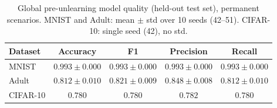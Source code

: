 \begin{table}[H]
\centering
\caption{Global pre-unlearning model quality (held-out test set), permanent scenarios. MNIST and Adult: mean $\pm$ std over 10 seeds (42--51). CIFAR-10: single seed (42), no std.}
\label{tab:baseline}
\small
\begin{tabular}{@{} l c c c c @{}}
\toprule
\textbf{Dataset} & \textbf{Accuracy} & \textbf{F1} & \textbf{Precision} & \textbf{Recall} \\
\midrule
MNIST & $0.993 \pm 0.000$ & $0.993 \pm 0.000$ & $0.993 \pm 0.000$ & $0.993 \pm 0.000$ \\
Adult & $0.812 \pm 0.010$ & $0.821 \pm 0.009$ & $0.848 \pm 0.008$ & $0.812 \pm 0.010$ \\
CIFAR-10 & $0.780$ & $0.780$ & $0.782$ & $0.780$ \\
\bottomrule
\end{tabular}
\end{table}
